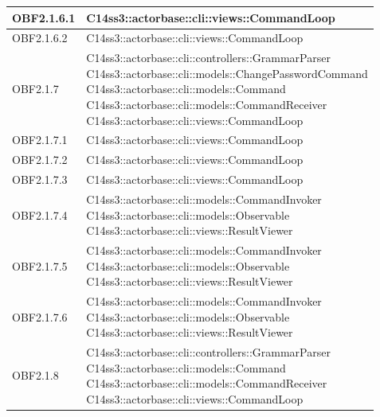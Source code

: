 \documentclass{scalatekids-article}
\begin{document}
\begin{longtable}[H]{|p{4.5cm}|p{13cm}|}
\hline
OBF2.1.6.1 & \multiLineCell[t]{C14ss3::actorbase::cli::views::CommandLoop\\}\\
\hline
OBF2.1.6.2 & \multiLineCell[t]{C14ss3::actorbase::cli::views::CommandLoop\\}\\
\hline
OBF2.1.7 & \multiLineCell[t]{C14ss3::actorbase::cli::controllers::GrammarParser\\C14ss3::actorbase::cli::models::ChangePasswordCommand\\C14ss3::actorbase::cli::models::Command\\C14ss3::actorbase::cli::models::CommandReceiver\\C14ss3::actorbase::cli::views::CommandLoop\\}\\
\hline
OBF2.1.7.1 & \multiLineCell[t]{C14ss3::actorbase::cli::views::CommandLoop\\}\\
\hline
OBF2.1.7.2 & \multiLineCell[t]{C14ss3::actorbase::cli::views::CommandLoop\\}\\
\hline
OBF2.1.7.3 & \multiLineCell[t]{C14ss3::actorbase::cli::views::CommandLoop\\}\\
\hline
OBF2.1.7.4 & \multiLineCell[t]{C14ss3::actorbase::cli::models::CommandInvoker\\C14ss3::actorbase::cli::models::Observable\\C14ss3::actorbase::cli::views::ResultViewer\\}\\
\hline
OBF2.1.7.5 & \multiLineCell[t]{C14ss3::actorbase::cli::models::CommandInvoker\\C14ss3::actorbase::cli::models::Observable\\C14ss3::actorbase::cli::views::ResultViewer\\}\\
\hline
OBF2.1.7.6 & \multiLineCell[t]{C14ss3::actorbase::cli::models::CommandInvoker\\C14ss3::actorbase::cli::models::Observable\\C14ss3::actorbase::cli::views::ResultViewer\\}\\
\hline
OBF2.1.8 & \multiLineCell[t]{C14ss3::actorbase::cli::controllers::GrammarParser\\C14ss3::actorbase::cli::models::Command\\C14ss3::actorbase::cli::models::CommandReceiver\\C14ss3::actorbase::cli::views::CommandLoop\\}\\

\end{longtable}
\end{document}
